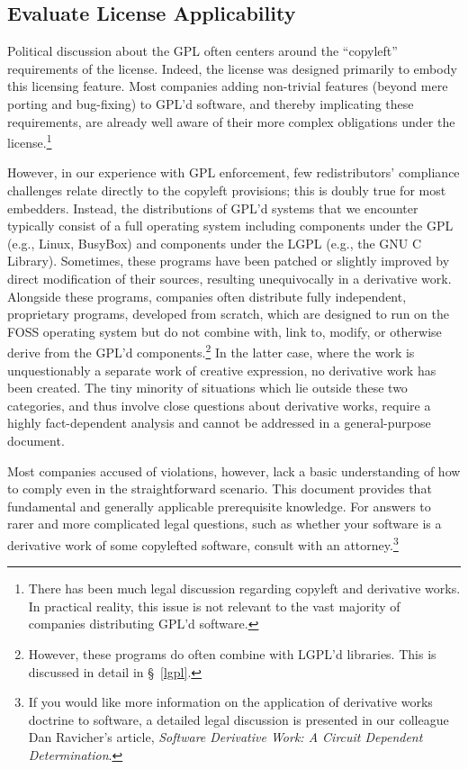 \documentclass[letterpaper]{fixme}
\begin{document}
\subsection{Evaluate License Applicability}
\label{derivative-works}
Political discussion about the GPL often centers around the ``copyleft''
requirements of the license.  Indeed, the license was designed primarily
to embody this licensing feature.  Most companies adding non-trivial
features (beyond mere porting and bug-fixing) to GPL'd software, and
thereby implicating these requirements, are already well aware of their
more complex obligations under the license.\footnote{There has been much legal
  discussion regarding copyleft and derivative works.  In practical
  reality, this issue is not relevant to the vast majority of companies
  distributing GPL'd software.}

However, in our experience with GPL enforcement, few redistributors'
compliance challenges relate directly to the copyleft provisions; this is
doubly true for most embedders.  Instead, the distributions of GPL'd
systems that we encounter typically consist of a full operating system
including components under the GPL (e.g., Linux, BusyBox) and components
under the LGPL (e.g., the GNU C Library).  Sometimes, these programs have
been patched or slightly improved by direct modification of their sources,
resulting unequivocally in a derivative work.  Alongside these programs,
companies often distribute fully independent, proprietary programs,
developed from scratch, which are designed to run on the FOSS operating
system but do not combine with, link to, modify, or otherwise derive from
the GPL'd components.\footnote{However, these programs do often combine
  with LGPL'd libraries. This is discussed in detail in \S~\ref{lgpl}.}
In the latter case, where the work is unquestionably a separate work of
creative expression, no derivative work has been created.  The tiny
minority of situations which lie outside these two categories, and thus
involve close questions about derivative works, require a highly
fact-dependent analysis and cannot be addressed in a general-purpose
document.

Most companies accused of violations, however, lack a basic understanding
of how to comply even in the straightforward scenario.  This document
provides that fundamental and generally applicable prerequisite knowledge.
For answers to rarer and more complicated legal questions, such as whether
your software is a derivative work of some copylefted software, consult
with an attorney.\footnote{If you would like more information on the
  application of derivative works doctrine to software, a detailed legal
  discussion is presented in our colleague Dan Ravicher's article,
  \textit{Software Derivative Work: A Circuit Dependent Determination}.}
\end{document}
